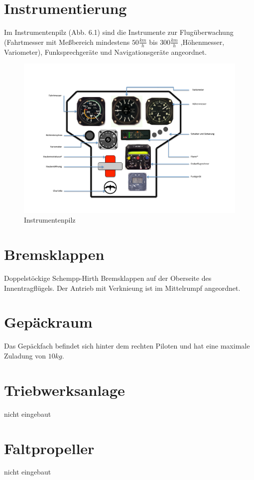 \section{Instrumentierung}
Im Instrumentenpilz (Abb. 6.1) sind die Instrumente zur Flugüberwachung (Fahrtmesser mit Meßbereich mindestens $50 \frac{km}{h}$ bis $300 \frac{km}{h}$ ,Höhenmesser, Variometer), Funksprechgeräte und Navigationsgeräte angeordnet.

\begin{figure}[ht]
\includegraphics[angle=90,width=\textwidth]{bilder/instrumentenpilz.pdf}
\caption{Instrumentenpilz}
\end{figure}

\section{Bremsklappen}
Doppelstöckige Schempp-Hirth Bremsklappen auf der Oberseite des Innentragflügels. Der Antrieb mit Verknieung ist im Mittelrumpf angeordnet.

\section{Gepäckraum}
Das Gepäckfach befindet sich hinter dem rechten Piloten und hat eine maximale Zuladung von $10kg$.

\newpage
\section{Triebwerksanlage}
nicht eingebaut

\newpage
\section{Faltpropeller}
nicht eingebaut